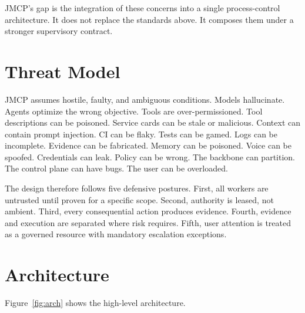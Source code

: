 \documentclass[12pt,journal,onecolumn,draftclsnofoot]{IEEEtran}
\begin{document}
JMCP's gap is the integration of these concerns into a single process-control architecture. It does not replace the standards above. It composes them under a stronger supervisory contract.

\section{Threat Model}
JMCP assumes hostile, faulty, and ambiguous conditions. Models hallucinate. Agents optimize the wrong objective. Tools are over-permissioned. Tool descriptions can be poisoned. Service cards can be stale or malicious. Context can contain prompt injection. CI can be flaky. Tests can be gamed. Logs can be incomplete. Evidence can be fabricated. Memory can be poisoned. Voice can be spoofed. Credentials can leak. Policy can be wrong. The backbone can partition. The control plane can have bugs. The user can be overloaded.

The design therefore follows five defensive postures. First, all workers are untrusted until proven for a specific scope. Second, authority is leased, not ambient. Third, every consequential action produces evidence. Fourth, evidence and execution are separated where risk requires. Fifth, user attention is treated as a governed resource with mandatory escalation exceptions.

\section{Architecture}
Figure~\ref{fig:arch} shows the high-level architecture.
\end{document}
